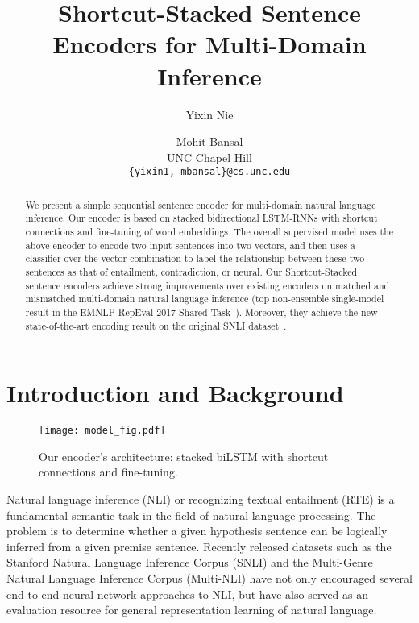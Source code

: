 \documentclass[11pt,letterpaper]{article}
\title{Shortcut-Stacked Sentence Encoders for Multi-Domain Inference}
\author{Yixin Nie \and Mohit Bansal \\
        UNC Chapel Hill\\
        \texttt{\{yixin1, mbansal\}@cs.unc.edu}
        }
\date{}
\begin{document}
\maketitle

\begin{abstract}
We present a simple sequential sentence encoder for multi-domain natural language inference. Our encoder is based on stacked bidirectional LSTM-RNNs with shortcut connections and fine-tuning of word embeddings. The overall supervised  model uses the above encoder to encode two input sentences into two vectors, and then uses a classifier over the vector combination to label the relationship between these two sentences as that of entailment, contradiction, or neural. Our Shortcut-Stacked sentence encoders achieve strong improvements over existing encoders on matched and mismatched multi-domain natural language inference (top non-ensemble single-model result in the EMNLP RepEval 2017 Shared Task~\cite{nangia2017repeval}). Moreover, they achieve the new state-of-the-art encoding result on the original SNLI dataset~\cite{snli:emnlp2015}.


\end{abstract}


\section{Introduction and Background}

\begin{figure*}[ht!]
\centering
\texttt{[image: model\_fig.pdf]}
\vspace{-35pt}
\caption{Our encoder's architecture: stacked biLSTM with shortcut connections and fine-tuning.\label{fig:model}}
\end{figure*}


Natural language inference (NLI) or recognizing textual entailment (RTE) is a fundamental semantic task in the field of natural language processing. The problem is to determine whether a given hypothesis sentence can be logically inferred from a given premise sentence.
Recently released datasets such as the Stanford Natural Language Inference Corpus \cite{snli:emnlp2015} (SNLI) and the Multi-Genre Natural Language Inference Corpus \cite{williams2017broad} (Multi-NLI) have not only encouraged several end-to-end neural network approaches to NLI, but have also served as an evaluation resource for general representation learning of natural language.
\end{document}
